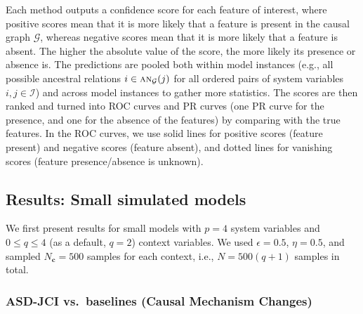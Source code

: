 \documentclass[twoside,11pt]{article}
\newcommand\B[1]{\bm{#1}}
\newcommand\C[1]{\mathcal{#1}}
\newcommand\mathbfsc[1]{\text{\normalfont\scshape#1}}
\newcommand\ansub[2]{\mathbfsc{an}_{#1}(#2)}
\begin{document}
Each method outputs a confidence score for each feature of interest, where
positive scores mean that it is more likely that a feature is present in the
causal graph $\C{G}$, whereas negative scores mean that it is more likely that
a feature is absent. The higher the absolute value of the score, the more likely
its presence or absence is. The predictions are pooled both within model instances
(e.g., all possible ancestral relations $i \in \ansub{\C{G}}{j}$ for all ordered
pairs of system variables $i,j \in \C{I}$) and across model instances to gather 
more statistics. The scores are
then ranked and turned into ROC curves and PR curves (one PR curve for the
presence, and one for the absence of the features) by comparing with the true
features. In the ROC curves, we use solid lines for positive scores (feature present)
and negative scores (feature absent), and dotted lines for vanishing scores (feature presence/absence is unknown).


\subsection{Results: Small simulated models}

We first present results for small models with $p=4$ system variables and $0 \le q \le 4$ (as a default, $q=2$) context variables.
We used $\epsilon = 0.5$, $\eta = 0.5$, and sampled $N_{\B{c}} = 500$ samples for each context, i.e.,
$N = 500 (q+1)$ samples in total.

\subsubsection{ASD-JCI vs.\ baselines (Causal Mechanism Changes)\label{sec:results_asd-jci_mc}}
\end{document}
